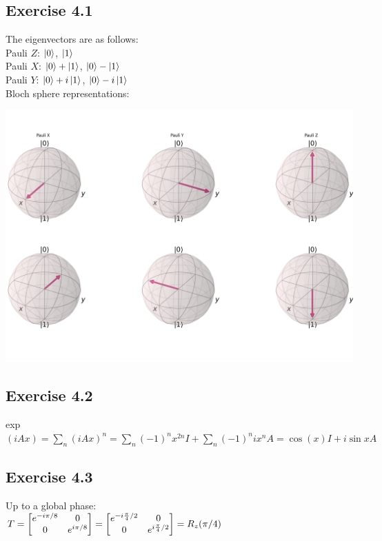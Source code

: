 \documentclass[a4paper,12pt]{article}
\begin{document}
\subsection*{Exercise 4.1}
The eigenvectors are as follows:\\
Pauli $Z$: $\ket{0}$, $\ket{1}$\\
Pauli $X$: $\ket{0}+\ket{1}$, $\ket{0}-\ket{1}$\\
Pauli $Y$: $\ket{0}+i\ket{1}$, $\ket{0}-i\ket{1}$\\
Bloch sphere representations:

\includegraphics*[scale=0.4]{4.1.png}
\subsection*{Exercise 4.2}
exp$(iAx)=\displaystyle\sum_n(iAx)^n=
\displaystyle\sum_n(-1)^nx^{2n}I+\displaystyle\sum_n(-1)^nix^nA=
\cos(x)I+i\sin{x}A$
\subsection*{Exercise 4.3}
Up to a global phase:\\
$T=\noindent\begin{bmatrix}
    e^{-i\pi/8} &0\\
    0 & e^{i\pi/8}
\end{bmatrix}=
\begin{bmatrix}
    e^{-i\frac{\pi}{4}/2} &0\\
    0 & e^{i\frac{\pi}{4}/2}
\end{bmatrix}=
R_z(\pi/4)$
\end{document}
